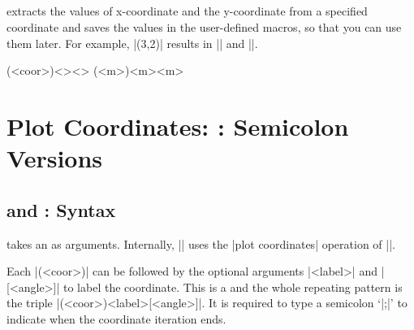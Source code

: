 \section{\protect\cmd{\tzgetxyval}}
\label{s:tzgetxyval}

\icmd{\tzgetxyval} extracts the values of x-coordinate and the y-coordinate  from a specified coordinate and saves the values in the user-defined macros, so that you can use them later.
For example, |\tzgetxyval(3,2){\xval}{\yval}| results in || and ||.

\begin{tzdef}
\tzgetxyval(<coor>){<\macroXval>}{<\macroYval>}
(<m>){<m>}{<m>}
\end{tzdef}

\begin{tzcode}{.3}
\end{tzcode}


\chapter{Plot Coordinates: \protect\cmd{\tzplot}: Semicolon Versions}
\label{c:plotcoordinates}

\section{\protect\cmd{\tzplot} and \protect\cmd{\tzplot*}: Syntax}
\label{s:tzplot}

\icmd{\tzplot} takes an  as arguments. Internally, |\tzplot| uses the |plot coordinates| operation of |\Tikz|.

Each |(<coor>)| can be followed by the optional arguments |{<label>}| and |[<angle>]| to label the coordinate. This is a  and the whole repeating pattern is the triple |(<coor>){<label>}[<angle>]|. It is required to type a semicolon `|;|' to indicate when the coordinate iteration ends.

